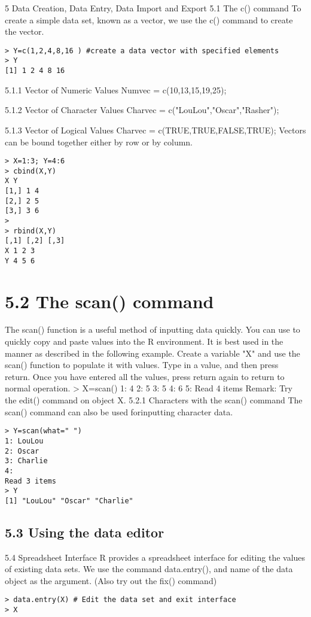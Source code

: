 
5 Data Creation, Data Entry, Data Import and Export
5.1 The c() command
To create a simple data set, known as a vector, we use the c() command to create the vector.
\begin{verbatim}
> Y=c(1,2,4,8,16 ) #create a data vector with specified elements
> Y
[1] 1 2 4 8 16
\end{verbatim}
5.1.1 Vector of Numeric Values
Numvec = c(10,13,15,19,25);

5.1.2 Vector of Character Values
Charvec = c("LouLou","Oscar","Rasher");


5.1.3 Vector of Logical Values
Charvec = c(TRUE,TRUE,FALSE,TRUE);
Vectors can be bound together either by row or by column.
\begin{verbatim}
> X=1:3; Y=4:6
> cbind(X,Y)
X Y
[1,] 1 4
[2,] 2 5
[3,] 3 6
>
> rbind(X,Y)
[,1] [,2] [,3]
X 1 2 3
Y 4 5 6
\end{verbatim}
\section{5.2 The scan() command}
The scan() function is a useful method of inputting data quickly. You can use to quickly copy
and paste values into the R environment. It is best used in the manner as described in the
following example. Create a variable "X" and use the scan() function to populate it with
values. Type in a value, and then press return. Once you have entered all the values, press
return again to return to normal operation.
> X=scan()
1: 4
2: 5
3: 5
4: 6
5:
Read 4 items
Remark: Try the edit() command on object X.
5.2.1 Characters with the scan() command
The scan() command can also be used forinputting character data.
\begin{verbatim}
> Y=scan(what=" ")
1: LouLou
2: Oscar
3: Charlie
4:
Read 3 items
> Y
[1] "LouLou" "Oscar" "Charlie"
\end{verbatim}
\subsection*{5.3 Using the data editor}
5.4 Spreadsheet Interface
R provides a spreadsheet interface for editing the values of existing data sets. We use the
command data.entry(), and name of the data object as the argument. (Also try out the
fix() command)
\begin{verbatim}
> data.entry(X) # Edit the data set and exit interface
> X

\end{verbatim}



